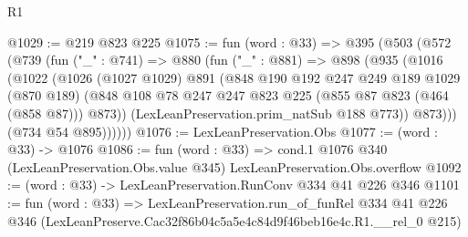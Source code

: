 \begin{lexlean}{R1}
\begin{coremodule}
@1029 := @219 @823 @225
@1075 := fun (word : @33) =>
  @395
    (@503
      (@572
        (@739
          (fun ("_" : @741) =>
          @880
            (fun ("_" : @881) =>
            @898
              (@935
                (@1016
                  (@1022
                    (@1026
                      (@1027 @1029)
                      @891
                      (@848
                        @190
                        @192
                        @247
                        @249
                        @189
                        @1029
                        (@870 @189)
                        (@848 @108 @78 @247 @247 @823 @225 (@855 @87 @823 (@464 (@858 @87))) @873))
                      (LexLeanPreservation.prim_natSub @188 @773))
                    @873)))
              (@734 @54 @895))))))
@1076 := LexLeanPreservation.Obs
@1077 := (word : @33) -> @1076
@1086 := fun (word : @33) =>
  cond.{1} @1076 @340 (LexLeanPreservation.Obs.value @345) LexLeanPreservation.Obs.overflow
@1092 := (word : @33) -> LexLeanPreservation.RunConv @334 @41 @226 @346
@1101 := fun (word : @33) =>
  LexLeanPreservation.run_of_funRel
    @334
    @41
    @226
    @346
    (LexLeanPreserve.Cac32f86b04c5a5e4c84d9f46beb16e4c.R1.__rel_0 @215)
\end{coremodule}
\end{lexlean}
